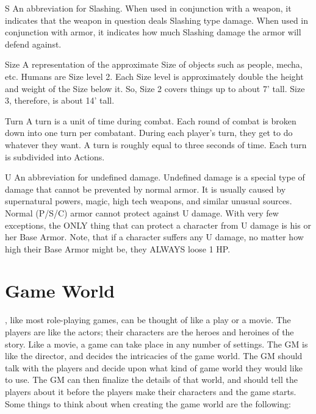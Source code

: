 \documentclass[twoside]{book}
\begin{document}
              
               S   
                  An abbreviation for Slashing. When used in
                 conjunction with a weapon, it indicates that the weapon
                 in question deals Slashing type damage. When used in
                 conjunction with armor, it indicates how much Slashing
                 damage the armor will defend against. 
              
              
               Size   
                  A representation of the approximate Size of
                 objects such as people, mecha, etc. Humans are Size
                 level 2. Each Size level is approximately double the
                 height and weight of the Size below it. So, Size 2
                 covers things up to about 7' tall. Size 3,
                 therefore, is about 14' tall. 
              
              
               Turn   
                  A turn is a unit of time during combat. Each
                 round of combat is broken down into one turn per
                 combatant. During each player's turn, they get to
                 do whatever they want. A turn is roughly equal to three
                 seconds of time. Each turn is subdivided into Actions.
                 
              
              
               U   
                  An abbreviation for undefined damage. Undefined
                 damage is a special type of damage that cannot be
                 prevented by normal armor. It is usually caused by
                 supernatural powers, magic, high tech weapons, and
                 similar unusual sources. Normal (P/S/C) armor cannot
                 protect against U damage. With very few exceptions, the
                 ONLY thing that can protect a character from U damage is
                 his or her Base Armor. Note, that if a character suffers
                 any U damage, no matter how high their Base Armor might
                 be, they ALWAYS loose 1 HP. 
              
          
\section{Game World}
    \APATHY{}, like most role-playing games, can be
            thought of like a play or a movie. The players are like the
            actors; their characters are the heroes and heroines of the
            story. Like a movie, a game can take place in any number of
            settings. The GM is like the director, and decides the
            intricacies of the game world.
           The GM should talk with the players and decide upon
             what kind of game world they would like to use. The GM can
             then finalize the details of that world, and should tell the
             players about it before the players make their characters
             and the game starts.  Some things to think about when creating the game
             world are the following:   
              
\end{document}
